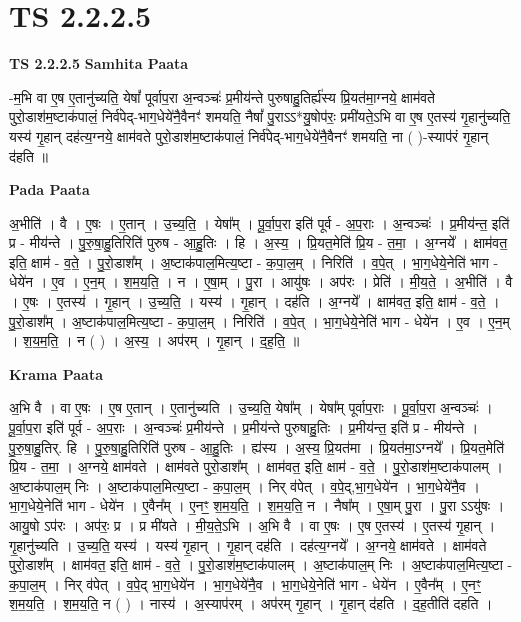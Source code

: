 \documentclass[17pt]{extarticle}
\begin{document}
\section*{ TS 2.2.2.5 }

\textbf{TS 2.2.2.5 } \newline
\textbf{Samhita Paata} \newline

-म॒भि वा ए॒ष ए॒तानु॑च्यति॒ येषां᳚ पूर्वाप॒रा अ॒न्वञ्चः॑ प्र॒मीय॑न्ते पुरुषाहु॒तिर्ह्य॑स्य प्रि॒यत॑मा॒ग्नये॒ क्षाम॑वते पुरो॒डाश॑म॒ष्टाक॑पालं॒ निर्व॑पेद्-भाग॒धेये॑नै॒वैनꣳ॑ शमयति॒ नैषां᳚ पु॒राऽऽ*यु॒षोप॑रः॒ प्रमी॑यते॒ऽभि वा ए॒ष ए॒तस्य॑ गृ॒हानु॑च्यति॒ यस्य॑ गृ॒हान् दह॑त्य॒ग्नये॒ क्षाम॑वते पुरो॒डाश॑म॒ष्टाक॑पालं॒ निर्व॑पेद्-भाग॒धेये॑नै॒वैनꣳ॑ शमयति॒ ना ( )-स्याप॑रं गृ॒हान् द॑हति ॥ \newline

\textbf{Pada Paata} \newline

अ॒भीति॑ । वै । ए॒षः । ए॒तान् । उ॒च्य॒ति॒ । येषा᳚म् । पू॒र्वा॒प॒रा इति॑ पूर्व - अ॒प॒राः । अ॒न्वञ्चः॑ । प्र॒मीय॑न्त॒ इति॑ प्र - मीय॑न्ते । पु॒रु॒षा॒हु॒तिरिति॑ पुरुष - आ॒हु॒तिः । हि । अ॒स्य॒ । प्रि॒यत॒मेति॑ प्रि॒य - त॒मा॒ । अ॒ग्नये᳚ । क्षाम॑वत॒ इति॒ क्षाम॑ - व॒ते॒ । पु॒रो॒डाश᳚म् । अ॒ष्टाक॑पाल॒मित्य॒ष्टा - क॒पा॒ल॒म् । निरिति॑ । व॒पे॒त् । भा॒ग॒धेये॒नेति॑ भाग - धेये॑न । ए॒व । ए॒न॒म् । श॒म॒य॒ति॒ । न । ए॒षा॒म् । पु॒रा । आयु॑षः । अप॑रः । प्रेति॑ । मी॒य॒ते॒ । अ॒भीति॑ । वै । ए॒षः । ए॒तस्य॑ । गृ॒हान् । उ॒च्य॒ति॒ । यस्य॑ । गृ॒हान् । दह॑ति । अ॒ग्नये᳚ । क्षाम॑वत॒ इति॒ क्षाम॑ - व॒ते॒ । पु॒रो॒डाश᳚म् । अ॒ष्टाक॑पाल॒मित्य॒ष्टा - क॒पा॒ल॒म् । निरिति॑ । व॒पे॒त् । भा॒ग॒धेये॒नेति॑ भाग - धेये॑न । ए॒व । ए॒न॒म् । श॒य॒म॒ति॒ । न ( ) । अ॒स्य॒ । अप॑रम् । गृ॒हान् । द॒ह॒ति॒ ॥  \newline


\textbf{Krama Paata} \newline

अ॒भि वै । वा ए॒षः । ए॒ष ए॒तान् । ए॒तानु॑च्यति । उ॒च्य॒ति॒ येषा᳚म् । येषा᳚म् पूर्वाप॒राः । पू॒र्वा॒प॒रा अ॒न्वञ्चः॑ । पू॒र्वा॒प॒रा इति॑ पूर्व - अ॒प॒राः । अ॒न्वञ्चः॑ प्र॒मीय॑न्ते । प्र॒मीय॑न्ते पुरुषाहु॒तिः । प्र॒मीय॑न्त॒ इति॑ प्र - मीय॑न्ते । पु॒रु॒षा॒हु॒तिर्. हि । पु॒रु॒षा॒हु॒तिरिति॑ पुरुष - आ॒हु॒तिः । ह्य॑स्य । अ॒स्य॒ प्रि॒यत॑मा । प्रि॒यत॑मा॒ऽग्नये᳚ । प्रि॒यत॒मेति॑ प्रि॒य - त॒मा॒ । अ॒ग्नये॒ क्षाम॑वते । क्षाम॑वते पुरो॒डाश᳚म् । क्षाम॑वत॒ इति॒ क्षाम॑ - व॒ते॒ । पु॒रो॒डाश॑म॒ष्टाक॑पालम् । अ॒ष्टाक॑पाल॒म् निः । अ॒ष्टाक॑पाल॒मित्य॒ष्टा - क॒पा॒ल॒म् । निर् व॑पेत् । व॒पे॒द्,भा॒ग॒धेये॑न । भा॒ग॒धेये॑नै॒व । भा॒ग॒धेये॒नेति॑ भाग - धेये॑न । ए॒वैन᳚म् । ए॒नꣳ॒॒ श॒म॒य॒ति॒ । श॒म॒य॒ति॒ न । नैषा᳚म् । ए॒षा॒म् पु॒रा । पु॒रा ऽऽयु॑षः । आयु॒षो ऽप॑रः । अप॑रः॒ प्र । प्र मी॑यते । मी॒य॒ते॒ऽभि । अ॒भि वै । वा ए॒षः । ए॒ष ए॒तस्य॑ । ए॒तस्य॑ गृ॒हान् । गृ॒हानु॑च्यति । उ॒च्य॒ति॒ यस्य॑ । यस्य॑ गृ॒हान् । गृ॒हान् दह॑ति । दह॑त्य॒ग्नये᳚ । अ॒ग्नये॒ क्षाम॑वते । क्षाम॑वते पुरो॒डाश᳚म् । क्षाम॑वत॒ इति॒ क्षाम॑ - व॒ते॒ । पु॒रो॒डाश॑म॒ष्टाक॑पालम् । अ॒ष्टाक॑पाल॒म् निः । अ॒ष्टाक॑पाल॒मित्य॒ष्टा - क॒पा॒ल॒म् । निर् व॑पेत् । व॒पे॒द् भा॒ग॒धेये॑न । भा॒ग॒धेये॑नै॒व । भा॒ग॒धेये॒नेति॑ भाग - धेये॑न । ए॒वैन᳚म् । ए॒नꣳ॒॒ श॒म॒य॒ति॒ । श॒म॒य॒ति॒ न ( ) । नास्य॑ । अ॒स्याप॑रम् । अप॑रम् गृ॒हान् । गृ॒हान् द॑हति । द॒ह॒तीति॑ दहति । \newline
\end{document}
